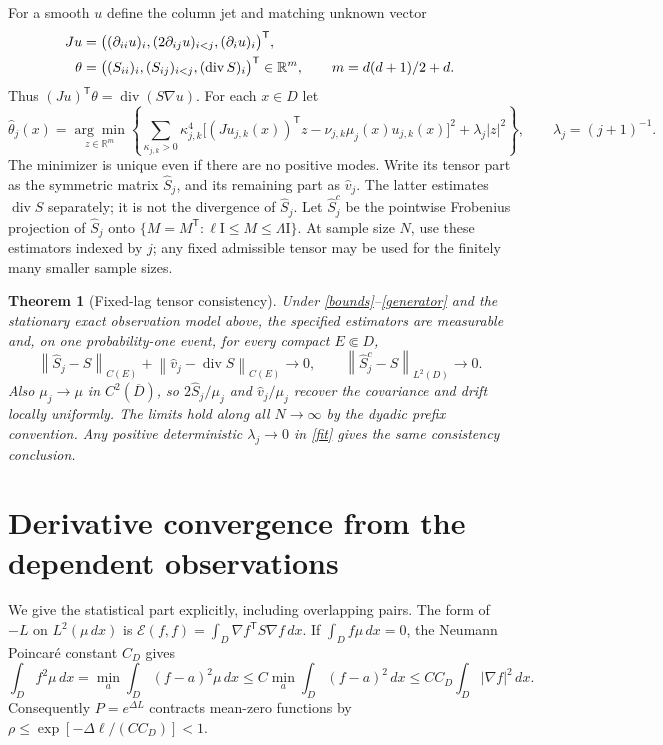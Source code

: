 \documentclass[11pt]{article}
\newtheorem{theorem}{Theorem}
\theoremstyle{remark}\newtheorem{remark}[theorem]{Remark}
\newcommand{\R}{\mathbb R}
\newcommand{\dd}{\,dx}
\newcommand{\Div}{\operatorname{div}}
\newcommand{\Id}{\mathrm I}
\newcommand{\tr}{\mathsf T}
\newcommand{\norm}[1]{\left\lVert#1\right\rVert}
\begin{document}
For a smooth $u$ define the column jet and matching unknown vector
\begin{align}
 Ju&=\big((\partial_{ii}u)_i,(2\partial_{ij}u)_{i<j},
                        (\partial_i u)_i\big)^\tr,\label{jet}\\
 \theta&=\big((S_{ii})_i,(S_{ij})_{i<j},(\Div S)_i\big)^\tr
        \in\R^m,\qquad m=d(d+1)/2+d.\notag
\end{align}
Thus $(Ju)^\tr\theta=\Div(S\nabla u)$. For each $x\in D$ let
\begin{equation}\label{fit}
 \widehat\theta_j(x)=\underset{z\in\R^m}{\arg\min}
 \left\{\sum_{\kappa_{j,k}>0}\kappa_{j,k}^4
 \big[(Ju_{j,k}(x))^\tr z-\nu_{j,k}\mu_j(x)u_{j,k}(x)\big]^2
       +\lambda_j|z|^2\right\},\qquad \lambda_j=(j+1)^{-1}.
\end{equation}
The minimizer is unique even if there are no positive modes. Write its tensor
part as the symmetric matrix $\widehat S_j$, and its remaining part as
$\widehat v_j$. The latter estimates $\Div S$ separately; it is not the
divergence of $\widehat S_j$. Let $\widehat S_j^c$ be the pointwise
Frobenius projection of $\widehat S_j$ onto
$\{M=M^\tr:\ell\Id\leq M\leq\Lambda\Id\}$. At sample size $N$, use
these estimators indexed by $j$; any fixed admissible tensor may be used for
the finitely many smaller sample sizes.

\begin{theorem}[Fixed-lag tensor consistency]\label{main}
Under \eqref{bounds}--\eqref{generator} and the stationary exact observation
model above, the specified estimators are measurable and, on one
probability-one event, for every compact $E\Subset D$,
\begin{equation}\label{local}
 \norm{\widehat S_j-S}_{C(E)}+
 \norm{\widehat v_j-\Div S}_{C(E)}\longrightarrow0,
 \qquad
 \norm{\widehat S_j^c-S}_{L^2(D)}\longrightarrow0.
\end{equation}
Also $\mu_j\to\mu$ in $C^2(\overline D)$, so
$2\widehat S_j/\mu_j$ and $\widehat v_j/\mu_j$ recover the covariance and
drift locally uniformly. The limits hold along all $N\to\infty$ by the
dyadic prefix convention. Any positive deterministic $\lambda_j\to0$ in
\eqref{fit} gives the same consistency conclusion.
\end{theorem}

\section{Derivative convergence from the dependent observations}
We give the statistical part explicitly, including overlapping pairs.
The form of $-L$ on $L^2(\mu\dd)$ is
$\mathcal E(f,f)=\int_D\nabla f^\tr S\nabla f\dd$. If
$\int_D f\mu\dd=0$, the Neumann Poincaré constant $C_D$ gives
\[
 \int_D f^2\mu\dd
 =\min_a\int_D(f-a)^2\mu\dd
 \leq C\min_a\int_D(f-a)^2\dd
 \leq CC_D\int_D|\nabla f|^2\dd.
\]
Consequently $P=e^{\Delta L}$ contracts mean-zero functions by
$\rho\leq\exp[-\Delta\ell/(CC_D)]<1$.
\end{document}
